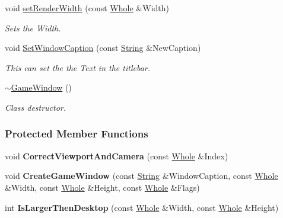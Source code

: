 \begin{DoxyCompactItemize}
void \hyperlink{classphys_1_1GameWindow_a4a6087112f5a958d153fc74bc03897ba}{setRenderWidth} (const \hyperlink{namespacephys_a460f6bc24c8dd347b05e0366ae34f34a}{Whole} \&Width)
\begin{DoxyCompactList}\small\item\em Sets the Width. \item\end{DoxyCompactList}\item 
void \hyperlink{classphys_1_1GameWindow_a95a0f35d2546c36d5698e835902f010c}{SetWindowCaption} (const \hyperlink{namespacephys_aa03900411993de7fbfec4789bc1d392e}{String} \&NewCaption)
\begin{DoxyCompactList}\small\item\em This can set the the Text in the titlebar. \item\end{DoxyCompactList}\item 
\hypertarget{classphys_1_1GameWindow_a2bda2adad1b64d1f85593cdcc74ece54}{
\hyperlink{classphys_1_1GameWindow_a2bda2adad1b64d1f85593cdcc74ece54}{$\sim$GameWindow} ()}
\label{classphys_1_1GameWindow_a2bda2adad1b64d1f85593cdcc74ece54}

\begin{DoxyCompactList}\small\item\em Class destructor. \item\end{DoxyCompactList}\end{DoxyCompactItemize}
\subsubsection*{Protected Member Functions}
\begin{DoxyCompactItemize}
\item 
\hypertarget{classphys_1_1GameWindow_a899c591968cc67db902eb3490b44bfec}{
void {\bfseries CorrectViewportAndCamera} (const \hyperlink{namespacephys_a460f6bc24c8dd347b05e0366ae34f34a}{Whole} \&Index)}
\label{classphys_1_1GameWindow_a899c591968cc67db902eb3490b44bfec}

\item 
\hypertarget{classphys_1_1GameWindow_adc0759b53d44ac8a81018a9f961a97c9}{
void {\bfseries CreateGameWindow} (const \hyperlink{namespacephys_aa03900411993de7fbfec4789bc1d392e}{String} \&WindowCaption, const \hyperlink{namespacephys_a460f6bc24c8dd347b05e0366ae34f34a}{Whole} \&Width, const \hyperlink{namespacephys_a460f6bc24c8dd347b05e0366ae34f34a}{Whole} \&Height, const \hyperlink{namespacephys_a460f6bc24c8dd347b05e0366ae34f34a}{Whole} \&Flags)}
\label{classphys_1_1GameWindow_adc0759b53d44ac8a81018a9f961a97c9}

\item 
\hypertarget{classphys_1_1GameWindow_a94674f9c968898df68fb58f30f91542e}{
int {\bfseries IsLargerThenDesktop} (const \hyperlink{namespacephys_a460f6bc24c8dd347b05e0366ae34f34a}{Whole} \&Width, const \hyperlink{namespacephys_a460f6bc24c8dd347b05e0366ae34f34a}{Whole} \&Height)}
\label{classphys_1_1GameWindow_a94674f9c968898df68fb58f30f91542e}

\end{DoxyCompactItemize}
